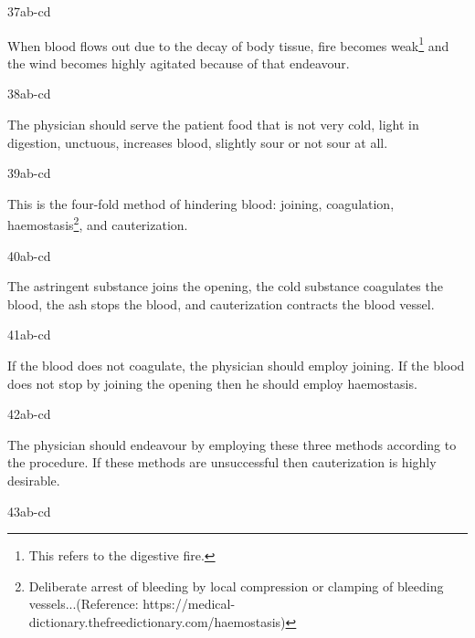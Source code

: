 \begin{translation}
\item[37ab-cd]

\begin{sloka}
When blood flows out due to the decay of body tissue, fire becomes weak\footnote{This refers to the digestive fire.} and the wind becomes highly agitated because of that endeavour.
\end{sloka}

\item[38ab-cd]

\begin{sloka}
The physician should serve the patient food that is not very cold, light in digestion, unctuous, increases blood, slightly sour or not sour at all. 
\end{sloka}

\item[39ab-cd]

\begin{sloka}
This is the four-fold method of hindering blood: joining, coagulation, haemostasis\footnote{Deliberate arrest of bleeding by local compression or clamping of bleeding vessels...(Reference: https://medical-dictionary.thefreedictionary.com/haemostasis)}, and cauterization.  
\end{sloka}

\item[40ab-cd]

\begin{sloka}
The astringent substance joins the opening, the cold substance coagulates the blood, the ash stops the blood, and cauterization contracts the blood vessel.
\end{sloka}

\item[41ab-cd]

\begin{sloka}
If the blood does not coagulate, the physician should employ joining. If the blood does not stop by joining the opening then he should employ haemostasis.
\end{sloka}

\item[42ab-cd]

\begin{sloka}
The physician should endeavour by employing these three methods according to the procedure. If these methods are unsuccessful then cauterization is highly desirable.
\end{sloka}

\item[43ab-cd]


\end{translation}
